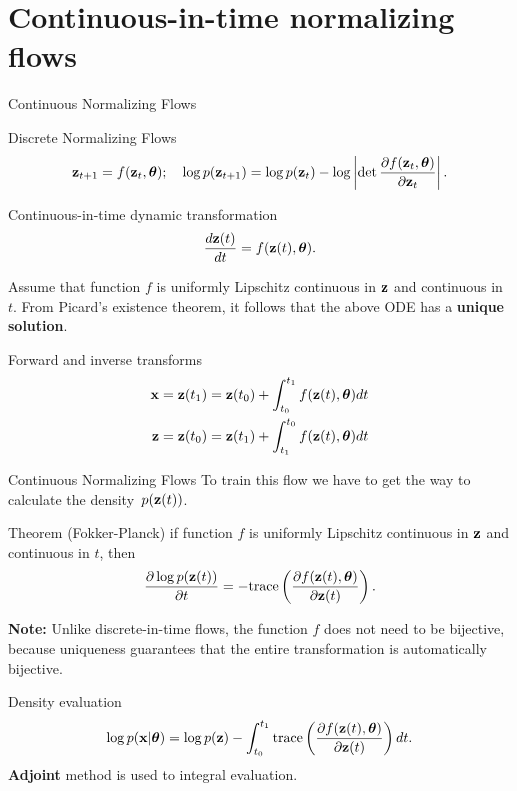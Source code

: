 \section{Continuous-in-time normalizing flows}
\begin{frame}{Continuous Normalizing Flows}
	\begin{block}{Discrete Normalizing Flows}
		\vspace{-0.8cm}
		  \[
		  \mathbf{z}_{t+1} = f(\mathbf{z}_t, \boldsymbol{\theta}); \quad \log p(\mathbf{z}_{t+1}) = \log p(\mathbf{z}_{t}) - \log \left| \det \frac{\partial f(\mathbf{z}_t, \boldsymbol{\theta})}{\partial \mathbf{z}_{t}} \right| .
		  \]
		\vspace{-0.7cm}
	\end{block}
	\begin{block}{Continuous-in-time dynamic transformation}
		\vspace{-0.2cm}
		\[
			\frac{d\mathbf{z}(t)}{dt} = f(\mathbf{z}(t), \boldsymbol{\theta}).
		\]
		\vspace{-0.4cm}
	\end{block}
	Assume that function $f$ is uniformly Lipschitz continuous in $\mathbf{z}$ and continuous in $t$. From Picard’s existence theorem, it follows that the above ODE has a \textbf{unique solution}.
	\begin{block}{Forward and inverse transforms}
		\vspace{-0.7cm}
		\begin{align*}
			\mathbf{x} &= \mathbf{z}(t_1) = \mathbf{z}(t_0) + \int_{t_0}^{t_1} f(\mathbf{z}(t), \boldsymbol{\theta}) dt \\
			\mathbf{z} &= \mathbf{z}(t_0) = \mathbf{z}(t_1) + \int_{t_1}^{t_0} f(\mathbf{z}(t), \boldsymbol{\theta}) dt \\
		\end{align*}
	\end{block}
\end{frame}
\begin{frame}{Continuous Normalizing Flows}
	To train this flow we have to get the way to calculate the density~$p(\mathbf{z}(t))$.
	\begin{block}{Theorem (Fokker-Planck)}
		if function $f$ is uniformly Lipschitz continuous in $\mathbf{z}$ and continuous in $t$, then
		\vspace{-0.3cm}
		\[
			\frac{\partial \log p(\mathbf{z}(t))}{\partial t} = - \text{trace} \left( \frac{\partial f (\mathbf{z}(t), \boldsymbol{\theta})}{\partial \mathbf{z}(t)} \right).
		\]
		\vspace{-0.5cm}
	\end{block}
	\textbf{Note:} Unlike discrete-in-time flows, the function $f$ does not need to be bijective, because uniqueness guarantees that the entire transformation is automatically bijective.
	\begin{block}{Density evaluation}
		\vspace{-0.4cm}
		\[
			\log p(\mathbf{x} | \boldsymbol{\theta}) = \log p(\mathbf{z}) - \int_{t_0}^{t_1} \text{trace}  \left( \frac{\partial f (\mathbf{z}(t), \boldsymbol{\theta})}{\partial \mathbf{z}(t)} \right) dt.
		\]
		\textbf{Adjoint} method is used to integral evaluation.
	\end{block}
\end{frame}
